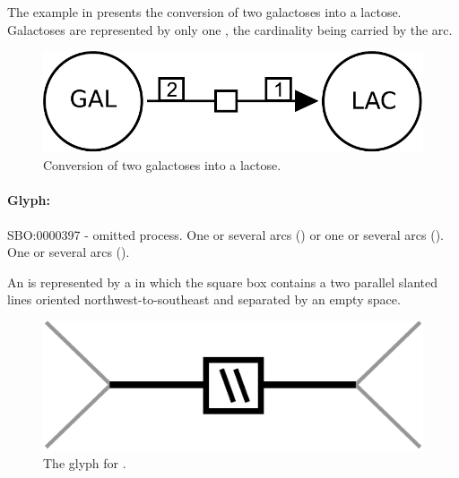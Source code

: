 The example in  presents the conversion of two galactoses into a lactose.  Galactoses are represented by only one , the cardinality being carried by the  arc.

\begin{figure}[H]
  \centering
  \includegraphics[scale = 0.3]{examples/process-dimerisation}
  \caption{Conversion of two galactoses into a lactose.}
  \label{fig:trans-dim}
\end{figure}



\paragraph{Glyph: }\label{sec:omitted}


\begin{glyphDescription}
 \glyphSboTerm SBO:0000397 - omitted process.
 \glyphOrigin One or several  arcs () or one or several  arcs ().
 \glyphTarget One or several  arcs ().

 \glyphNode An  is represented by a  in which the square box contains a two parallel slanted lines oriented northwest-to-southeast and separated by an empty space.
 \end{glyphDescription}

\begin{figure}[H]
  \centering
  \includegraphics[scale = 0.5]{images/omitted}
  \caption{The \PD glyph for .}
  \label{fig:omitted}
\end{figure}


